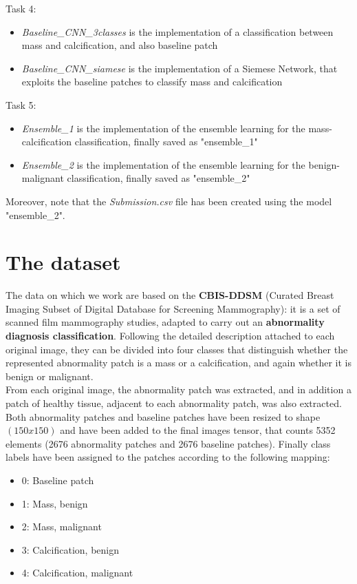 \documentclass[11pt,a4paper,oneside]{article}
\begin{document}
Task 4:
\begin{itemize}
\item \textit{Baseline\_CNN\_3classes} is the implementation of a classification between mass and calcification, and also baseline patch
\item \textit{Baseline\_CNN\_siamese} is the implementation of a Siemese Network, that exploits the baseline patches to classify mass and calcification
\end{itemize}
Task 5:
\begin{itemize}
\item \textit{Ensemble\_1} is the implementation of the ensemble learning for the mass-calcification classification, finally saved as "ensemble\_1"
\item \textit{Ensemble\_2} is the implementation of the ensemble learning for the benign-malignant classification, finally saved as "ensemble\_2"
\end{itemize}
\vspace{10mm}
Moreover, note that the \textit{Submission.csv} file has been created using the model "ensemble\_2".

\clearpage

\section{The dataset}
The data on which we work are based on the \textbf{CBIS-DDSM} (Curated Breast Imaging Subset of Digital Database for Screening Mammography): it is a set of scanned film mammography studies, adapted to carry out an \textbf{abnormality diagnosis classification}. Following the detailed description attached to each original image, they can be divided into four classes that distinguish whether the represented abnormality patch is a mass or a calcification, and again whether it is benign or malignant. \\
From each original image, the abnormality patch was extracted, and in addition a patch of healthy tissue, adjacent to each abnormality patch, was also extracted. Both abnormality patches and baseline patches have been resized to shape $(150x150)$ and have been added to the final images tensor, that counts 5352 elements (2676 abnormality patches and 2676 baseline patches).
Finally class labels have been assigned to the patches according to the following mapping:
\begin{itemize}
\item 0: Baseline patch
\item 1: Mass, benign
\item 2: Mass, malignant
\item 3: Calcification, benign
\item 4: Calcification, malignant
\end{itemize}
\end{document}
